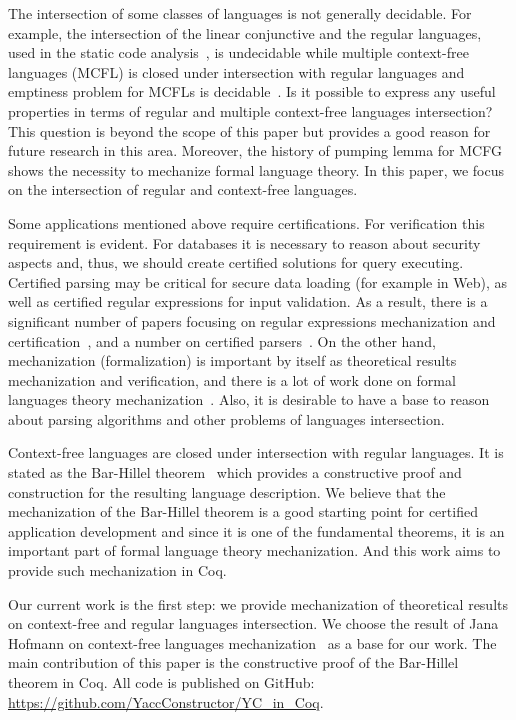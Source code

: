 \documentclass[runningheads]{llncs}
\begin{document}
The intersection of some classes of languages is not generally decidable.
For example, the intersection of the linear conjunctive and the regular languages, used in the static code analysis~\cite{zhang2017context}, is undecidable while multiple context-free languages (MCFL) is closed under intersection with regular languages and emptiness problem for MCFLs is decidable~\cite{SEKI1991191}.
Is it possible to express any useful properties in terms of regular and multiple context-free languages intersection?
This question is beyond the scope of this paper but provides a good reason for future research in this area.
Moreover, the history of pumping lemma for MCFG shows the necessity to mechanize formal language theory.
In this paper, we focus on the intersection of regular and context-free languages.

Some applications mentioned above require certifications.
For verification this requirement is evident.
For databases it is necessary to reason about security aspects and, thus, we should create certified solutions for query executing.
Certified parsing may be critical for secure data loading (for example in Web), as well as certified regular expressions for input validation.
As a result, there is a significant number of papers focusing on regular expressions mechanization and certification~\cite{10.1007/978-3-319-03545-1_7}, and a number on certified parsers~\cite{10.1007/978-3-642-00590-9_12,firsov2014certified,Gross2015ParsingPA}.
On the other hand, mechanization (formalization) is important by itself as theoretical results mechanization and verification, and there is a lot of work done on formal languages theory mechanization~\cite{firsov2015certified,ramos2016formalization,1885-16399}.
Also, it is desirable to have a base to reason about parsing algorithms and other problems of languages intersection.

Context-free languages are closed under intersection with regular languages.
It is stated as the Bar-Hillel theorem~\cite{bar1961formal} which provides a constructive proof and construction for the resulting language description.
We believe that the mechanization of the Bar-Hillel theorem is a good starting point for certified application development and since it is one of the fundamental theorems, it is an important part of formal language theory mechanization.
And this work aims to provide such mechanization in Coq.

Our current work is the first step: we provide mechanization of theoretical results on context-free and regular languages intersection.
We choose the result of Jana Hofmann on context-free languages mechanization~\cite{smolkaHofmann2016} as a base for our work.
The main contribution of this paper is the constructive proof of the Bar-Hillel theorem in Coq. All code is published on GitHub: \url{https://github.com/YaccConstructor/YC_in_Coq}.
\end{document}
